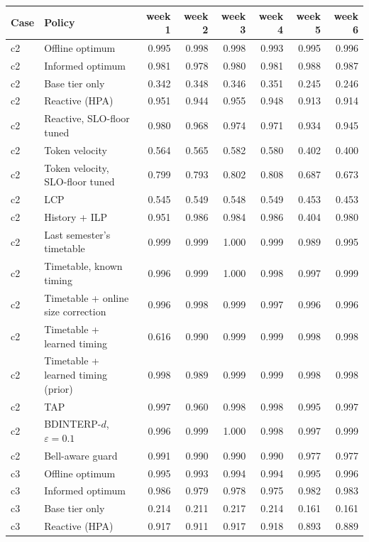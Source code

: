 \begin{tabular}{@{}llrrrrrr@{}}
\toprule
Case & Policy & week 1 & week 2 & week 3 & week 4 & week 5 & week 6 \\
\midrule
c2 & Offline optimum & 0.995 & 0.998 & 0.998 & 0.993 & 0.995 & 0.996 \\
c2 & Informed optimum & 0.981 & 0.978 & 0.980 & 0.981 & 0.988 & 0.987 \\
c2 & Base tier only & 0.342 & 0.348 & 0.346 & 0.351 & 0.245 & 0.246 \\
c2 & Reactive (HPA) & 0.951 & 0.944 & 0.955 & 0.948 & 0.913 & 0.914 \\
c2 & Reactive, SLO-floor tuned & 0.980 & 0.968 & 0.974 & 0.971 & 0.934 & 0.945 \\
c2 & Token velocity & 0.564 & 0.565 & 0.582 & 0.580 & 0.402 & 0.400 \\
c2 & Token velocity, SLO-floor tuned & 0.799 & 0.793 & 0.802 & 0.808 & 0.687 & 0.673 \\
c2 & LCP & 0.545 & 0.549 & 0.548 & 0.549 & 0.453 & 0.453 \\
c2 & History + ILP & 0.951 & 0.986 & 0.984 & 0.986 & 0.404 & 0.980 \\
c2 & Last semester's timetable & 0.999 & 0.999 & 1.000 & 0.999 & 0.989 & 0.995 \\
c2 & Timetable, known timing & 0.996 & 0.999 & 1.000 & 0.998 & 0.997 & 0.999 \\
c2 & Timetable + online size correction & 0.996 & 0.998 & 0.999 & 0.997 & 0.996 & 0.996 \\
c2 & Timetable + learned timing & 0.616 & 0.990 & 0.999 & 0.999 & 0.998 & 0.998 \\
c2 & Timetable + learned timing (prior) & 0.998 & 0.989 & 0.999 & 0.999 & 0.998 & 0.998 \\
c2 & TAP & 0.997 & 0.960 & 0.998 & 0.998 & 0.995 & 0.997 \\
c2 & BDINTERP-$d$, $\varepsilon=0.1$ & 0.996 & 0.999 & 1.000 & 0.998 & 0.997 & 0.999 \\
c2 & Bell-aware guard & 0.991 & 0.990 & 0.990 & 0.990 & 0.977 & 0.977 \\
c3 & Offline optimum & 0.995 & 0.993 & 0.994 & 0.994 & 0.995 & 0.996 \\
c3 & Informed optimum & 0.986 & 0.979 & 0.978 & 0.975 & 0.982 & 0.983 \\
c3 & Base tier only & 0.214 & 0.211 & 0.217 & 0.214 & 0.161 & 0.161 \\
c3 & Reactive (HPA) & 0.917 & 0.911 & 0.917 & 0.918 & 0.893 & 0.889 \\

\end{tabular}
